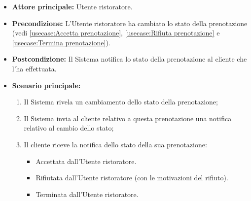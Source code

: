 \label{usecase:Notifica stato della prenotazione}
\begin{itemize}
	\item \textbf{Attore principale:} Utente ristoratore.
	
	\item \textbf{Precondizione:} L'Utente ristoratore ha cambiato lo stato della prenotazione (vedi \autoref{usecase:Accetta prenotazione},
     \autoref{usecase:Rifiuta prenotazione} e \autoref{usecase:Termina prenotazione}).

    
	\item \textbf{Postcondizione:} Il Sistema notifica lo stato della prenotazione al cliente che l'ha effettuata.
     
	\item \textbf{Scenario principale:}
	      \begin{enumerate}
                \item Il Sistema rivela un cambiamento dello stato della prenotazione;
                \item Il Sistema invia al cliente relativo a questa prenotazione una notifica relativo al cambio dello stato;
                \item Il cliente riceve la notifica dello stato della sua prenotazione:
                \begin{itemize}
                    \item Accettata dall'Utente ristoratore.
                    \item Rifiutata dall'Utente ristoratore (con le motivazioni del rifiuto).
                    \item Terminata dall'Utente ristoratore.
                \end{itemize}
	      \end{enumerate}
\end{itemize}